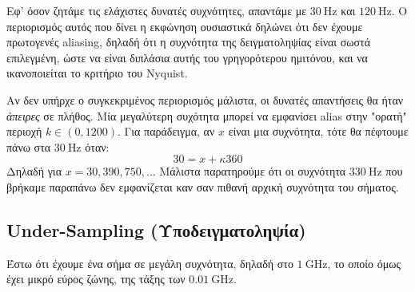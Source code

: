 \documentclass[11pt,a4paper,notitlepage,fleqn]{article}
\let\mytodo\todo
\renewcommand{\todo}[1]{\par\mytodo[inline,noline]{#1}}
\begin{document}
\begin{exercise}
	Εφ' όσον ζητάμε τις ελάχιστες δυνατές συχνότητες, απαντάμε με \( \SI{30}{\hertz} \) και \( \SI{120}{\hertz} \).
	Ο περιορισμός αυτός που δίνει η εκφώνηση ουσιαστικά δηλώνει ότι δεν έχουμε πρωτογενές aliasing, δηλαδή
	ότι η συχνότητα της δειγματοληψίας είναι σωστά επιλεγμένη, ώστε να είναι διπλάσια αυτής του
	γρηγορότερου ημιτόνου, και να ικανοποιείται το κριτήριο του Nyquist.
	
	Αν δεν υπήρχε ο συγκεκριμένος περιορισμός μάλιστα, οι δυνατές απαντήσεις θα ήταν \emph{άπειρες}
	σε πλήθος. Μία μεγαλύτερη συχότητα μπορεί να εμφανίσει alias στην "ορατή" περιοχή \( k \in (0,1200) \). Για παράδειγμα, αν \( x \) είναι μια συχνότητα, τότε θα πέφτουμε πάνω στα \( \SI{30}{\hertz} \)
	όταν:
	\[
	30 = x + κ360
	\]
	Δηλαδή για \( x=30,390,750,\dots \) Μάλιστα παρατηρούμε ότι οι συχνότητα \( \SI{330}{\hertz} \)
	που βρήκαμε παραπάνω
	δεν εμφανίζεται καν σαν πιθανή αρχική συχνότητα του σήματος.
	
	\todo{solve in another way}
\end{exercise}


\subsection{Under-Sampling (Υποδειγματοληψία)}

\begin{center}
\end{center}

Έστω ότι έχουμε ένα σήμα σε μεγάλη συχνότητα, δηλαδή στο \( \SI{1}{\giga\hertz} \), το οποίο όμως έχει μικρό
εύρος ζώνης, της τάξης των \( \SI{0.01}{\giga\hertz} \).
\end{document}
